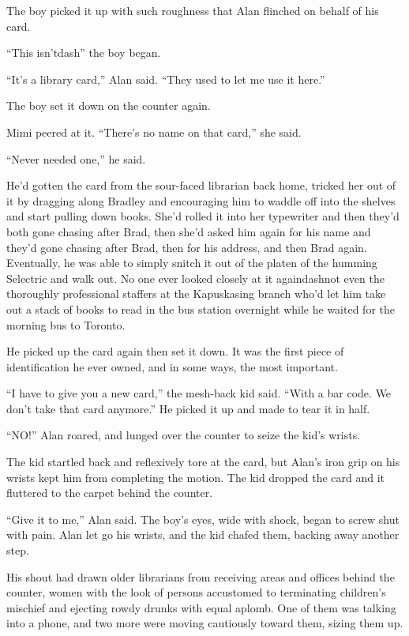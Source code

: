 The boy picked it up with such roughness that Alan flinched on behalf
of his card.

``This isn'tdash{}'' the boy began.

``It's a library card,'' Alan said.  ``They used to let me use it
here.''

The boy set it down on the counter again.

Mimi peered at it.  ``There's no name on that card,'' she said.

``Never needed one,'' he said.

He'd gotten the card from the sour-faced librarian back home, tricked
her out of it by dragging along Bradley and encouraging him to waddle
off into the shelves and start pulling down books.  She'd rolled it
into her typewriter and then they'd both gone chasing after Brad, then
she'd asked him again for his name and they'd gone chasing after Brad,
then for his address, and then Brad again.  Eventually, he was able to
simply snitch it out of the platen of the humming Selectric and walk
out.  No one ever looked closely at it againdash{}not even the thoroughly
professional staffers at the Kapuskasing branch who'd let him take out
a stack of books to read in the bus station overnight while he waited
for the morning bus to Toronto.

He picked up the card again then set it down.  It was the first piece
of identification he ever owned, and in some ways, the most important.

``I have to give you a new card,'' the mesh-back kid said.  ``With a
bar code.  We don't take that card anymore.'' He picked it up and made
to tear it in half.

``NO!'' Alan roared, and lunged over the counter to seize the kid's
wrists.

The kid startled back and reflexively tore at the card, but Alan's
iron grip on his wrists kept him from completing the motion.  The kid
dropped the card and it fluttered to the carpet behind the counter.

``Give it to me,'' Alan said.  The boy's eyes, wide with shock, began
to screw shut with pain.  Alan let go his wrists, and the kid chafed
them, backing away another step.

His shout had drawn older librarians from receiving areas and offices
behind the counter, women with the look of persons accustomed to
terminating children's mischief and ejecting rowdy drunks with equal
aplomb.  One of them was talking into a phone, and two more were
moving cautiously toward them, sizing them up.

